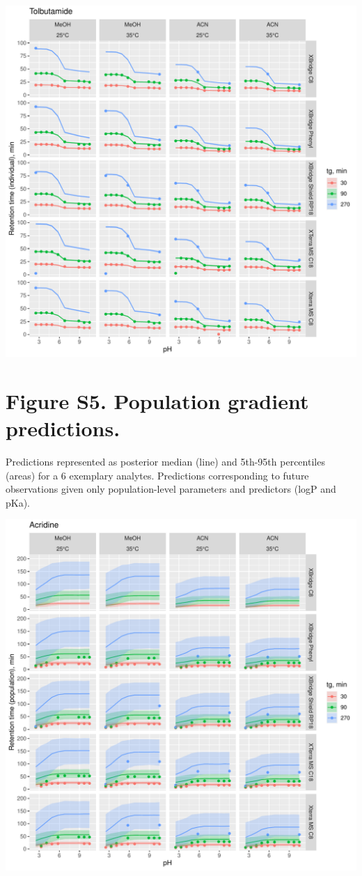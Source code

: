 \documentclass[
]{article}
\begin{document}
\newpage{}

\includegraphics{../figures/concordanceplots/Tolbutamide.individual.pdf}

\newpage{}

\hypertarget{figure-s5.-population-gradient-predictions.}{%
\section{Figure S5. Population gradient
predictions.}\label{figure-s5.-population-gradient-predictions.}}

Predictions represented as posterior median (line) and 5th-95th
percentiles (areas) for a 6 exemplary analytes. Predictions
corresponding to future observations given only population-level
parameters and predictors (logP and pKa).

\includegraphics{../figures/concordanceplots/Acridine.population.pdf}
\end{document}
